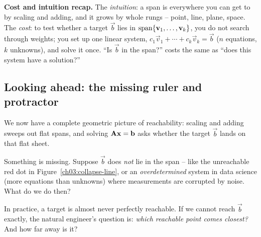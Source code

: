 \begin{recoverybox}
\textbf{Cost and intuition recap.} The \emph{intuition}: a span is everywhere you can get to by scaling and adding, and it grows by whole rungs -- point, line, plane, space. The \emph{cost}: to test whether a target $\vec{b}$ lies in $\operatorname{span}\{\mathbf{v}_1,\dots,\mathbf{v}_k\}$, you do not search through weights; you set up one linear system, $c_1\vec{v}_1+\cdots+c_k\vec{v}_k=\vec{b}$ ($n$ equations, $k$ unknowns), and solve it once. ``Is $\vec{b}$ in the span?'' costs the same as ``does this system have a solution?''
\end{recoverybox}

\subsection*{Looking ahead: the missing ruler and protractor}

We now have a complete geometric picture of reachability: scaling and adding sweeps out flat spans, and solving $\mathbf{A}\mathbf{x}=\mathbf{b}$ asks whether the target $\vec{b}$ lands on that flat sheet.

Something is missing. Suppose $\vec{b}$ does \emph{not} lie in the span -- like the unreachable red dot in Figure~\ref{ch03:collapse-line}, or an \emph{overdetermined} system in data science (more equations than unknowns) where measurements are corrupted by noise. What do we do then?

In practice, a target is almost never perfectly reachable. If we cannot reach $\vec{b}$ exactly, the natural engineer's question is: \emph{which reachable point comes closest?} And how far away is it?

